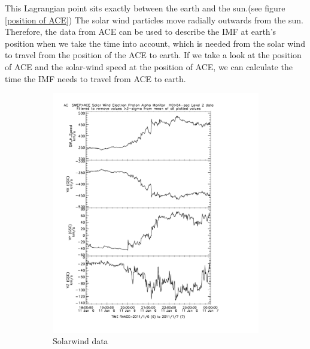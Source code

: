 \documentclass[10pt,a4paper]{article}
\begin{document}
This Lagrangian point sits exactly between the earth and the sun.(see figure \ref{position of ACE}) The solar wind particles move radially outwards from the sun. Therefore, the data from ACE can be used to describe the IMF at earth's position when we take the time into account, which is needed from the solar wind to travel from the position of the ACE to earth. 
If we take a look at the position of ACE and the solar-wind speed at the position of ACE, we can calculate the time the IMF needs to travel from ACE to earth. 

\begin{figure}[h]
\centering
\begin{subfigure}{0.45\textwidth}
\centering
	\includegraphics[width=\textwidth]{ACE_solarwindspeed.pdf}
	\caption{ Solarwind data\label{ACE Solarwindspeed}}
\end{subfigure}
\begin{subfigure}{0.45\textwidth}
\centering

\end{subfigure}
\end{figure}
\end{document}
